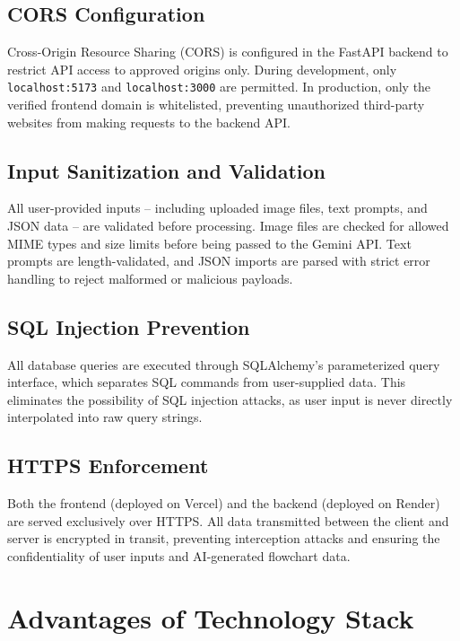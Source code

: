\subsection{CORS Configuration}
\label{subsec:cors}

Cross-Origin Resource Sharing (CORS) is configured in the 
FastAPI backend to restrict API access to approved origins 
only. During development, only \texttt{localhost:5173} and 
\texttt{localhost:3000} are permitted. In production, only the 
verified frontend domain is whitelisted, preventing 
unauthorized third-party websites from making requests to the 
backend API.

\subsection{Input Sanitization and Validation}
\label{subsec:input-validation}

All user-provided inputs -- including uploaded image files, 
text prompts, and JSON data -- are validated before processing. 
Image files are checked for allowed MIME types and size limits 
before being passed to the Gemini API. Text prompts are 
length-validated, and JSON imports are parsed with strict error 
handling to reject malformed or malicious 
payloads.

\subsection{SQL Injection Prevention}
\label{subsec:sql-injection}

All database queries are executed through SQLAlchemy's 
parameterized query interface, which separates SQL commands 
from user-supplied data. This eliminates the possibility of 
SQL injection attacks, as user input is never directly 
interpolated into raw query strings.

\subsection{HTTPS Enforcement}
\label{subsec:https}

Both the frontend (deployed on Vercel) and the backend 
(deployed on Render) are served exclusively over HTTPS. All 
data transmitted between the client and server is encrypted 
in transit, preventing interception attacks and ensuring the 
confidentiality of user inputs and AI-generated flowchart 
data.

\section{Advantages of Technology Stack}
\label{sec:tech-advantages}

